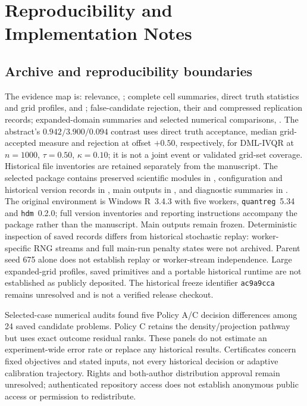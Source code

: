 \section{Reproducibility and Implementation Notes}
\label{app:reproducibility}
\setcounter{equation}{0}\setcounter{table}{0}\setcounter{figure}{0}
\subsection{Archive and reproducibility boundaries}
\label{app:evidence-map}
\WfourRepository
The evidence map is: relevance, ; complete cell summaries, direct truth statistics and grid profiles,  and ; false-candidate rejection, their  and compressed replication records; expanded-domain summaries and selected numerical comparisons, . The abstract's $0.942/3.900/0.094$ contrast uses direct truth acceptance, median grid-accepted measure and rejection at offset $+0.50$, respectively, for DML-IVQR at $n=1000$, $\tau=0.50$, $\kappa=0.10$; it is not a joint event or validated grid-set coverage. Historical file inventories are retained separately from the manuscript.
The selected package contains preserved scientific modules in , configuration and historical version records in , main outputs in , and diagnostic summaries in . The original environment is Windows R~3.4.3 with five workers, \texttt{quantreg}~5.34 and \texttt{hdm}~0.2.0; full version inventories and reporting instructions accompany the package rather than the manuscript. Main outputs remain frozen. Deterministic inspection of saved records differs from historical stochastic replay: worker-specific RNG streams and full main-run penalty states were not archived. Parent seed 675 alone does not establish replay or worker-stream independence. Large expanded-grid profiles, saved primitives and a portable historical runtime are not established as publicly deposited. The historical freeze identifier \texttt{ac9a9cca} remains unresolved and is not a verified release checkout.

Selected-case numerical audits found five Policy A/C decision differences among 24 saved candidate problems. Policy C retains the density/projection pathway but uses exact outcome residual ranks. These panels do not estimate an experiment-wide error rate or replace any historical results. Certificates concern fixed objectives and stated inputs, not every historical decision or adaptive calibration trajectory. Rights and both-author distribution approval remain unresolved; authenticated repository access does not establish anonymous public access or permission to redistribute.

